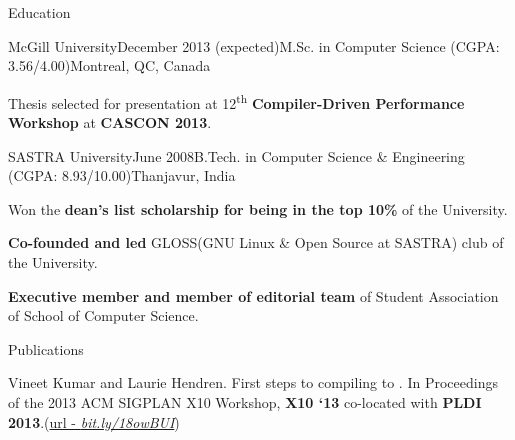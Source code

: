 \documentclass{resume} %
\begin{document}
 \begin{rSection}{Education}

\begin{rSubsection}{McGill University}{December 2013 (expected)}{M.Sc. in Computer Science (CGPA: 3.56/4.00)}{Montreal, QC, Canada}
\item Thesis selected for presentation at 12\textsuperscript{th} \textbf{Compiler-Driven Performance Workshop} at \textbf{CASCON 2013}.
\end{rSubsection}
\begin{rSubsection}{SASTRA University}{June 2008}{B.Tech. in Computer Science \& Engineering (CGPA: 8.93/10.00)}{Thanjavur, India}
\item Won the  \textbf{dean's list scholarship for being in the top 10\% }of the University. 
\item \textbf{Co-founded and led} GLOSS(GNU Linux \& Open Source at SASTRA) club of the University.
\item \textbf{Executive member and member of editorial team} of Student Association of School of Computer Science. 
\end{rSubsection}

\end{rSection}


\begin{rSection}{Publications}
\smallskip
\begin{lSubsection}
\item Vineet Kumar and Laurie Hendren. First steps to compiling \matlab to
\xten. In Proceedings of the 2013 ACM SIGPLAN X10 Workshop, \textbf{X10 `13}
co-located with \textbf{PLDI
2013}.(\href{http://www.sable.mcgill.ca/mclab/mix10/paper.pdf}{url - \em{bit.ly/18owBUI}})
\end{lSubsection}
\end{rSection}
\end{document}
